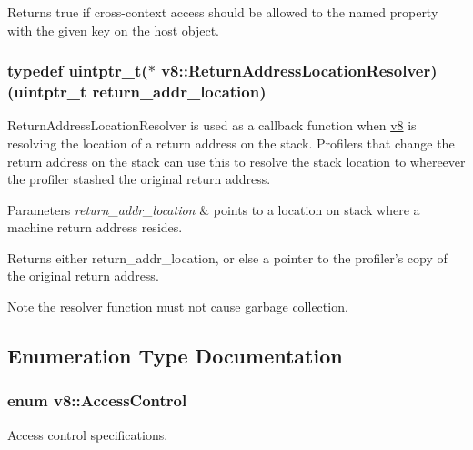 Returns true if cross-\/context access should be allowed to the named property with the given key on the host object. \hypertarget{namespacev8_ada64a30dd6abd8c4cbf34503cb4d3a7a}{
\subsubsection[{Return\-Address\-Location\-Resolver}]{\setlength{\rightskip}{0pt plus 5cm}typedef uintptr\-\_\-t($\ast$ v8\-::\-Return\-Address\-Location\-Resolver)(uintptr\-\_\-t return\-\_\-addr\-\_\-location)}}\label{namespacev8_ada64a30dd6abd8c4cbf34503cb4d3a7a}
Return\-Address\-Location\-Resolver is used as a callback function when \hyperlink{namespacev8}{v8} is resolving the location of a return address on the stack. Profilers that change the return address on the stack can use this to resolve the stack location to whereever the profiler stashed the original return address.


\begin{DoxyParams}{Parameters}
{\em return\-\_\-addr\-\_\-location} & points to a location on stack where a machine return address resides. \\
\hline
\end{DoxyParams}
\begin{DoxyReturn}{Returns}
either return\-\_\-addr\-\_\-location, or else a pointer to the profiler's copy of the original return address.
\end{DoxyReturn}
\begin{DoxyNote}{Note}
the resolver function must not cause garbage collection. 
\end{DoxyNote}


\subsection{Enumeration Type Documentation}
\hypertarget{namespacev8_a31d8355cb043d7d2dda3f4a52760b64e}{
\subsubsection[{Access\-Control}]{\setlength{\rightskip}{0pt plus 5cm}enum {\bf v8\-::\-Access\-Control}}}\label{namespacev8_a31d8355cb043d7d2dda3f4a52760b64e}
Access control specifications.

